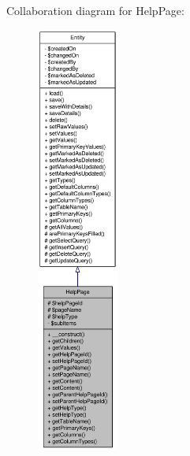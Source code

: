 Collaboration diagram for HelpPage:\nopagebreak
\begin{figure}[H]
\begin{center}
\leavevmode
\includegraphics[height=400pt]{classHelpPage__coll__graph}
\end{center}
\end{figure}
